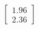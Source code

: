 \documentclass[preview]{standalone}
\begin{document}
\begin{align*}
\begin{bmatrix} 1.96 \\ 2.36 \end{bmatrix}
\end{align*}
\end{document}
